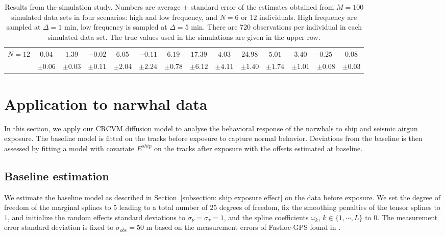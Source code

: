 \documentclass[aoas]{imsart}
\theoremstyle{definition}
\theoremstyle{remark}
\theoremstyle{remark}
\newcommand {\1}{\mathbb{1}}
\begin{document}
\begin{landscape}
\begin{table}
\begin{tabular}{|c|c|c|c|c|c|c|c|c|c|c|c|c|c|}
			
			\\
			\hline
			\multirow{2}{4em}{$N=12$} & $0.04$ &
			$1.39$ &
			$-0.02$ & $6.05$ &
			$-0.11$ &
			$6.19$ &
			$17.39$ &
			$4.03$ &
			$24.98$ &
			$5.01$ &
			$3.40$ & $0.25$ &
			$0.08 $
			\\
			& $\pm 0.06$  &
			$ \pm 0.03$ &
			$ \pm 0.11 $ & $ \pm 2.04$ &
			$ \pm 2.24$&
			$\pm 0.78$&
			$\pm 6.12$&
			$\pm 4.11$&
			$\pm 1.40$&
			$\pm 1.74$&
			$\pm 1.01$& $\pm 0.08$ &
			$\pm 0.03$
			
			
			
			\\
			\hline	
		\end{tabular}
		\caption{Results from the simulation study. Numbers are average $\pm$ standard error of the estimates obtained from $M=100$ simulated data sets in four scenarios: high and low frequency, and $N=6$ or $12$ individuals. High frequency are sampled at $\Delta = 1$ min, low frequency is sampled at $\Delta = 5$ min. There are 720 observations per individual in each simulated data set. The true values used in the simulations are given in the upper row.}
		\label{table: simulation study results}
	\end{table}
	
\end{landscape}








\section{Application to narwhal data}
\label{section: application}

In this section, we apply our CRCVM diffusion model to analyse the  behavioral response of the narwhals to ship and seismic airgun exposure.
The baseline model is fitted on the tracks before exposure to capture normal behavior. Deviations from the baseline is then assessed by fitting a model with covariate $E^{ship}$ on the tracks after exposure with the offsets estimated at baseline.


\subsection{Baseline estimation}
We estimate the baseline model as described in Section~\ref{subsection: ship exposure effect} on the data before exposure. We set the degree of freedom of the marginal splines to $5$ leading to a total number of $25$ degrees of freedom, fix the smoothing penalties of the tensor splines to $1$, and initialize the random effects standard deviations to $\sigma_{\nu}=\sigma_{\tau}=1$, and the spline coefficients $\omega_k$, $k \in \{1,\cdots,L\}$ to 0.
The measurement error standard deviation is fixed to $\sigma_{obs}=50$ m based on the measurement errors of Fastloc-GPS found in \citep{wensveen_path_2015}.\\
\end{document}
